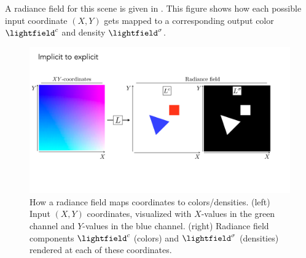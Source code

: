 A radiance field for this scene is given in \fig{\ref{fig:nerfs:flatland_implicit_to_explicit}}. This figure shows how each possible input coordinate $(X,Y)$ gets mapped to a corresponding 
output color $\lightfield^c$ and density $\lightfield^{\sigma}$.
\begin{figure}[h!]
    \centerline{
    \includegraphics[width=1.0\linewidth]{figures/nerfs/flatland_implicit_to_explicit_v2.pdf}
    }
    \caption{How a radiance field maps coordinates to colors/densities. (left) Input $(X,Y)$ coordinates, visualized with $X$-values in the green channel and $Y$-values in the blue channel. (right) Radiance field components $\lightfield^c$ (colors) and $\lightfield^\sigma$ (densities) rendered at each of these coordinates.}
    \label{fig:nerfs:flatland_implicit_to_explicit}
\end{figure}





